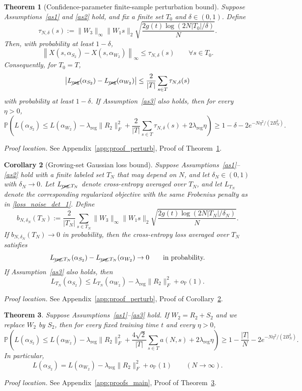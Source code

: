 \documentclass[11pt]{article}
\theoremstyle{plain}
\newtheorem{thm}{Theorem}[section]
\newtheorem{cor}[thm]{Corollary}
\theoremstyle{definition}
\theoremstyle{remark}
\newcommand{\PP}{\mathbb{P}}
\newcommand{\1}{\mathbf{1}}
\newcommand{\proofloc}[1]{\par\noindent\emph{Proof location.} #1\par}
\begin{document}
\begin{thm}[Confidence-parameter finite-sample perturbation bound]
\label{thm:finite_confidence_gaussian}
Suppose Assumptions~\ref{as1} and \ref{as2} hold, and fix a finite set \(T_0\) and \(\delta\in(0,1)\). Define
\[
\tau_{N,\delta}(s)
:=
\|W_3\|_\infty\|W_1s\|_2
\sqrt{\frac{2g(t)\log(2N|T_0|/\delta)}{N}}.
\]
Then, with probability at least \(1-\delta\),
\[
\left\|X(s,\alpha_{S_2})-X(s,\alpha_{W_2})\right\|_\infty
\le \tau_{N,\delta}(s)
\qquad\forall s\in T_0.
\]
Consequently, for \(T_0=T\),
\[
\left|
L_{\cancel{\mathrm{reg}}}(\alpha_{S_2})
-
L_{\cancel{\mathrm{reg}}}(\alpha_{W_2})
\right|
\le
\frac{2}{|T|}\sum_{s\in T}\tau_{N,\delta}(s)
\]
with probability at least \(1-\delta\).
If Assumption~\ref{as3} also holds, then for every \(\eta>0\),
\[
\PP\!\left(
L(\alpha_{S_2})
\le
L(\alpha_{W_2})
-\lambda_{\mathrm{reg}}\|R_2\|_F^2
+\frac{2}{|T|}\sum_{s\in T}\tau_{N,\delta}(s)
+2\lambda_{\mathrm{reg}}\eta
\right)
\ge
1-\delta-2e^{-N\eta^2/(2B_N^2)}.
\]
\end{thm}
\proofloc{See Appendix~\ref{app:proof_perturb}, Proof of Theorem~\ref{thm:finite_confidence_gaussian}.}

\begin{cor}[Growing-set Gaussian loss bound]
\label{cor:growing_set_gaussian_loss}
Suppose Assumptions~\ref{as1}--\ref{as2} hold with a finite labeled set \(T_N\) that may depend on \(N\), and let \(\delta_N\in(0,1)\) with \(\delta_N\to0\). Let \(L_{\cancel{\mathrm{reg}},T_N}\) denote cross-entropy averaged over \(T_N\), and let \(L_{T_N}\) denote the corresponding regularized objective with the same Frobenius penalty as in \eqref{loss_noise_det_1}. Define
\[
b_{N,\delta_N}(T_N):=
\frac{2}{|T_N|}
\sum_{s\in T_N}
\|W_3\|_\infty\|W_1s\|_2
\sqrt{\frac{2g(t)\log(2N|T_N|/\delta_N)}{N}}.
\]
If \(b_{N,\delta_N}(T_N)\to0\) in probability, then the cross-entropy loss averaged over \(T_N\) satisfies
\[
L_{\cancel{\mathrm{reg}},T_N}(\alpha_{S_2})
-
L_{\cancel{\mathrm{reg}},T_N}(\alpha_{W_2})
\to0
\qquad\text{in probability.}
\]
If Assumption~\ref{as3} also holds, then
\[
L_{T_N}(\alpha_{S_2})
\le
L_{T_N}(\alpha_{W_2})
-\lambda_{\mathrm{reg}}\|R_2\|_F^2
+o_{\PP}(1).
\]
\end{cor}
\proofloc{See Appendix~\ref{app:proof_perturb}, Proof of Corollary~\ref{cor:growing_set_gaussian_loss}.}

\begin{thm}
\label{theorem_reduction_of_loss}
Suppose Assumptions~\ref{as1}--\ref{as3} hold. If \(W_2=R_2+S_2\) and we replace \(W_2\) by \(S_2\), then for every fixed training time \(t\) and every \(\eta>0\),
\[
\PP\!\left(
L(\alpha_{S_2})
\le
L(\alpha_{W_2})
-\lambda_{\mathrm{reg}}\|R_2\|_F^2
+\frac{4\sqrt{2}}{|T|}\sum_{s\in T}a(N,s)
+2\lambda_{\mathrm{reg}}\eta
\right)
\ge
1-\frac{|T|}{N}-2e^{-N\eta^2/(2B_N^2)}.
\]
In particular,
\[
L(\alpha_{S_2})
=
L(\alpha_{W_2})
-\lambda_{\mathrm{reg}}\|R_2\|_F^2
+o_{\PP}(1)
\qquad(N\to\infty).
\]
\end{thm}
\proofloc{See Appendix~\ref{app:proofs_main}, Proof of Theorem~\ref{theorem_reduction_of_loss}.}
\end{document}
